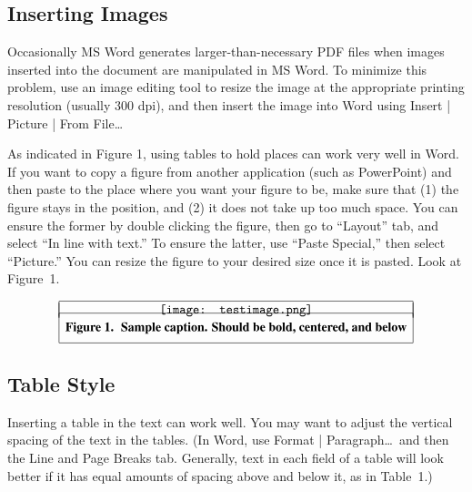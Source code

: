 \documentclass{icisfinal}
\begin{document}
\subsection{Inserting Images}
Occasionally MS Word generates larger-than-necessary PDF files when images
inserted into the document are manipulated in MS Word. To minimize this
problem, use an image editing tool to resize the image at the appropriate
printing resolution (usually 300 dpi), and then insert the image into Word using
Insert | Picture | From File\ldots

As indicated in Figure 1, using tables to hold places can work very well in
Word. If you want to copy a figure from another application (such as PowerPoint)
and then paste to the place where you want your figure to be, make sure that (1)
the figure stays in the position, and (2) it does not take up too much
space. You can ensure the former by double clicking the figure, then go to
``Layout'' tab, and select ``In line with text.'' To ensure the latter, use ``Paste
Special,'' then select ``Picture.'' You can resize the figure to your desired size
once it is pasted. Look at Figure~1.

\vspace{-0.2cm}
\begin{figure}[h]
	\[
	\begin{array}{|c|}
	\hline \\ [-11pt]
	\texttt{[image: testimage.png]} \\ [-4pt]
	\hline
	\addstackgap[7pt]{{\usefont{T1}{ptm}{b}{n}Figure 1.\hspace{0.09cm} Sample caption. Should be bold, centered, and below}}\\
	\hline
	\end{array}
	\]
	\caption*{}\label{fig:test} %
\end{figure}
\vspace{-0.9cm}


\subsection{Table Style}
Inserting a table in the text can work well. You may want to adjust the vertical
spacing of the text in the tables. (In Word, use Format | Paragraph\ldots~and
then the Line and Page Breaks tab. Generally, text in each field of a table will
look better if it has equal amounts of spacing above and below it, as in
Table~1.)
\end{document}
